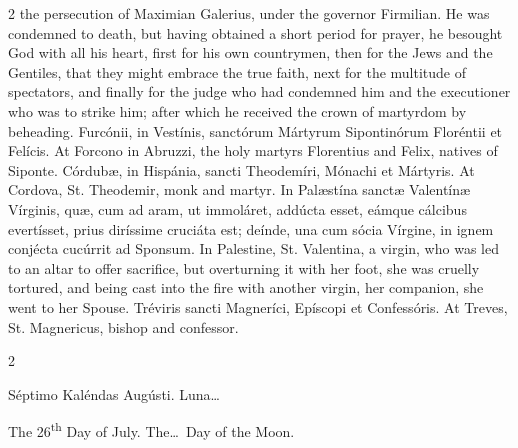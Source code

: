 \begin{paracol}{2}
 the persecution of Maximian Galerius, under the governor Firmilian. He 
 was condemned to death, but having obtained a short period for prayer, he 
 besought God with all his heart, first for his own countrymen, then for the 
 Jews and the Gentiles, that they might embrace the true faith, next for the 
 multitude of spectators, and finally for the judge who had condemned him and 
 the executioner who was to strike him; after which he received the crown of 
 martyrdom by beheading.
\switchcolumn*
{}
Furcónii, in Vestínis, 
 sanctórum Mártyrum Sipontinórum Floréntii et Felícis.
\switchcolumn
{}
At Forcono in Abruzzi, the holy 
 martyrs Florentius and Felix, natives of Siponte.
\switchcolumn*
{}
Córdubæ, in Hispánia, 
 sancti Theodemíri, Mónachi et Mártyris.
\switchcolumn
{}
At Cordova, St. Theodemir, monk and 
 martyr.
\switchcolumn*
{}
In Palæstína sanctæ 
 Valentínæ Vírginis, quæ, cum ad aram, ut immoláret, addúcta esset, eámque 
 cálcibus evertísset, prius diríssime cruciáta est; deínde, una cum sócia 
 Vírgine, in ignem conjécta cucúrrit ad Sponsum.
\switchcolumn
{}
In Palestine, St. Valentina, a 
 virgin, who was led to an altar to offer sacrifice, but overturning it with 
 her foot, she was cruelly tortured, and being cast into the fire with 
 another virgin, her companion, she went to her Spouse.
\switchcolumn*
{}
Tréviris sancti 
 Magneríci, Epíscopi et Confessóris.
\switchcolumn
{}
At Treves, St. Magnericus, bishop 
 and confessor.
\switchcolumn*
{}
\end{paracol}


\begin{paracol}{2}
\begin{center}{\color{gregoriocolor} Séptimo Kaléndas Augústi. 
 Luna\dots\ }\end{center}
\switchcolumn
{}
\begin{center}{\color{gregoriocolor} The 
 26\textsuperscript{th} Day of 
 July. The\dots\ Day of the Moon.}\end{center}
\end{paracol}

